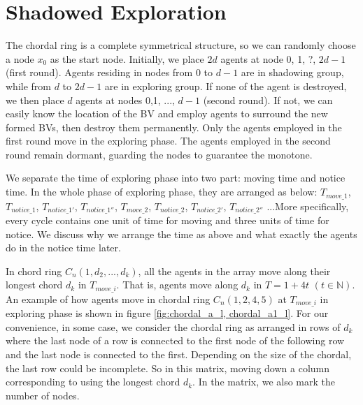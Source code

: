 \section{Shadowed Exploration}
The chordal ring is a complete symmetrical structure, so we can randomly choose a node $x_0$ as the start node. Initially, we place $2d$ agents at node 0, 1, ?, $2d-1$ (first round). Agents residing in nodes from $0$ to $d-1$ are in shadowing group, while from $d$ to $2d-1$ are in exploring group. If none of the agent is destroyed, we then place $d$ agents at nodes 0,1, ..., $d-1$ (second round). If not, we can easily know the location of the BV and employ agents to surround the new formed BVs, then destroy them permanently. Only the agents employed in the first round move in the exploring phase. The agents employed in the second round remain dormant, guarding the nodes to guarantee the monotone. 

We separate the time of exploring phase into two part: moving time and notice time. In the whole phase of exploring phase, they are arranged as below: $T_{move\_1}$, $T_{notice\_1}$, $T_{notice\_1'}$, $T_{notice\_1''}$, $T_{move\_2}$, $T_{notice\_2}$, $T_{notice\_2'}$, $T_{notice\_2''}$ ...More specifically, every cycle contains one unit of time for moving and three units of time for notice. We discuss why we arrange the time as above and what exactly the agents do in the notice time later. 

In chord ring $C_n(1, d_2, ..., d_k)$, all the agents in the array move along their longest chord $d_k$ in $T_{move\_i}$. That is, agents move along $d_k$ in $T=1+4t$ $(t\in \mathbb{N})$.  An example of how agents move in chordal ring $C_n(1, 2 , 4, 5)$ at $T_{move\_i}$ in exploring phase is shown in figure \ref{fig:chordal_a_l, chordal_a1_l}. For our convenience, in some case, we consider the chordal ring as arranged in rows of $d_k$ where the last node of a row is connected to the first node of the following row and the last node is connected to the first. Depending on the size of the chordal, the last row could be incomplete. So in this matrix, moving down a column corresponding to using the longest chord $d_k$. In the matrix, we also mark the number of nodes.

